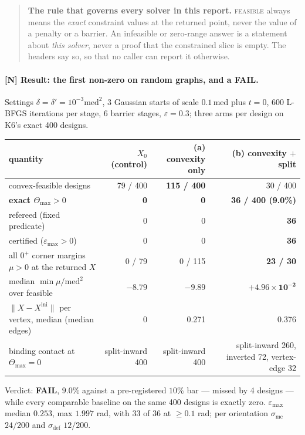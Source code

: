 \documentclass[11pt,a4paper]{article}
\theoremstyle{definition}
\newcommand{\Tmax}{\Theta_{\max}}
\begin{document}
\begin{quote}
\textbf{The rule that governs every solver in this report.} \textsc{feasible} always means the
\emph{exact} constraint values at the returned point, never the value of a penalty or a
barrier. An infeasible or zero-range answer is a statement about \emph{this solver}, never a
proof that the constrained slice is empty. The headers say so, so that no caller can report
it otherwise.
\end{quote}

\paragraph{[N] Result: the first non-zero on random graphs, and a FAIL.} Settings
$\delta=\delta'=10^{-3}\mathrm{med}^2$, 3 Gaussian starts of scale $0.1\,\mathrm{med}$ plus
$t=0$, 600 L-BFGS iterations per stage, 6 barrier stages, $\varepsilon=0.3$; three arms per
design on K6's exact 400 designs.

\begin{center}
\footnotesize
\begin{tabular}{@{}lrrr@{}}
\toprule
quantity & $X_0$ (control) & (a) convexity only & (b) convexity $+$ split \\
\midrule
convex-feasible designs & 79 / 400 & \textbf{115 / 400} & 30 / 400 \\
\textbf{exact $\Tmax>0$} & \textbf{0} & \textbf{0} & \textbf{36 / 400 (9.0\%)} \\
refereed (fixed predicate) & 0 & 0 & \textbf{36} \\
certified ($\varepsilon_{\max}>0$) & 0 & 0 & \textbf{36} \\
all $0^+$ corner margins $\mu>0$ at the returned $X$ & 0 / 79 & 0 / 115 & \textbf{23 / 30} \\
median $\min\mu/\mathrm{med}^2$ over feasible & $-8.79$ & $-9.89$ & $\mathbf{+4.96\times10^{-2}}$ \\
$\|X-X^{\mathrm{ini}}\|$ per vertex, median (median edges) & 0 & 0.271 & 0.376 \\
binding contact at $\Tmax=0$ & split-inward 400 & split-inward 400 & split-inward 260, inverted 72, vertex-edge 32 \\
\bottomrule
\end{tabular}
\end{center}

\noindent Verdict: \textbf{FAIL}, $9.0\%$ against a pre-registered $10\%$ bar --- missed by 4
designs --- while every comparable baseline on the same 400 designs is exactly zero.
$\varepsilon_{\max}$ median $0.253$, max $1.997$ rad, with $33$ of $36$ at
$\ge0.1$ rad; per orientation $\sigma_{\mathrm{mc}}$ $24/200$ and $\sigma_{\mathrm{def}}$
$12/200$.
\end{document}

